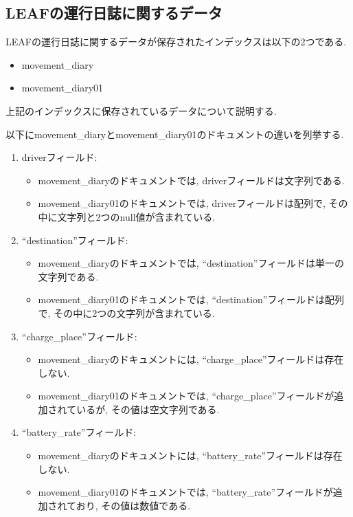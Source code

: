 \subsection{LEAFの運行日誌に関するデータ}

LEAFの運行日誌に関するデータが保存されたインデックスは以下の2つである.

\begin{itemize}
  \item movement\_diary
  \item movement\_diary01
\end{itemize}

上記のインデックスに保存されているデータについて説明する.

以下にmovement\_diaryとmovement\_diary01のドキュメントの違いを列挙する.

\begin{enumerate}
  \item driverフィールド:
        \begin{itemize}
          \item movement\_diaryのドキュメントでは, driverフィールドは文字列である.
          \item movement\_diary01のドキュメントでは, driverフィールドは配列で, その中に文字列と2つのnull値が含まれている.
        \end{itemize}
        
  \item ``destination''フィールド:
        \begin{itemize}
          \item movement\_diaryのドキュメントでは, ``destination''フィールドは単一の文字列である.
          \item movement\_diary01のドキュメントでは, ``destination''フィールドは配列で, その中に2つの文字列が含まれている.
        \end{itemize}
        
  \item ``charge\_place''フィールド:
        \begin{itemize}
          \item movement\_diaryのドキュメントには, ``charge\_place''フィールドは存在しない.
          \item movement\_diary01のドキュメントでは, ``charge\_place''フィールドが追加されているが, その値は空文字列である.
        \end{itemize}
        
  \item ``battery\_rate''フィールド:
        \begin{itemize}
          \item movement\_diaryのドキュメントには, ``battery\_rate''フィールドは存在しない.
          \item movement\_diary01のドキュメントでは, ``battery\_rate''フィールドが追加されており, その値は数値である.
        \end{itemize}
        

\end{enumerate}
